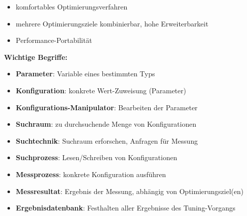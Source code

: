 \begin{frame}
\begin{itemize}
      \end{itemize}
      
    \begin{itemize}
      \item komfortables Optimierungsverfahren
      
      \item mehrere Optimierungsziele kombinierbar, hohe Erweiterbarkeit
      
       \item Performance-Portabilität
                  
    \end{itemize}
    \end{frame}
    \endgroup
    
  \begingroup
  \begin{frame}
    \textbf{Wichtige Begriffe:}
    
  \begin{itemize}

    \item \textbf{Parameter}: Variable eines bestimmten Typs 
    
    \item \textbf{Konfiguration}: konkrete Wert-Zuweisung (Parameter)
    \item \textbf{Konfigurations-Manipulator}: Bearbeiten der Parameter \newline
    
    \item \textbf{Suchraum}: zu durchsuchende Menge von Konfigurationen
    
    \item \textbf{Suchtechnik}: Suchraum erforschen, Anfragen für Messung
    \item \textbf{Suchprozess}: Lesen/Schreiben von Konfigurationen \newline
    
    \item \textbf{Messprozess}: konkrete Konfiguration ausführen
    \item \textbf{Messresultat}: Ergebnis der Messung, abhängig von Optimierungsziel(en)
    \item \textbf{Ergebnisdatenbank}: Festhalten aller Ergebnisse des Tuning-Vorgangs
    
  \end{itemize}
  \end{frame}
  \endgroup
        
